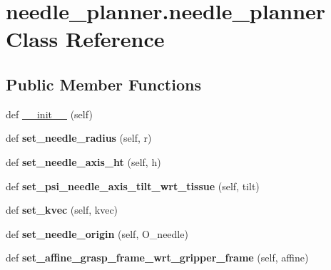 \hypertarget{classneedle__planner_1_1needle__planner}{}\section{needle\+\_\+planner.\+needle\+\_\+planner Class Reference}
\label{classneedle__planner_1_1needle__planner}
\subsection*{Public Member Functions}
\begin{DoxyCompactItemize}
\item 
def \hyperlink{classneedle__planner_1_1needle__planner_ad4b6932ae2ef9acccb0075ab793d9866}{\+\_\+\+\_\+init\+\_\+\+\_\+} (self)
\item 
def {\bfseries set\+\_\+needle\+\_\+radius} (self, r)\hypertarget{classneedle__planner_1_1needle__planner_a8e65096c2da1208e3cb48adcae4b94a6}{}\label{classneedle__planner_1_1needle__planner_a8e65096c2da1208e3cb48adcae4b94a6}

\item 
def {\bfseries set\+\_\+needle\+\_\+axis\+\_\+ht} (self, h)\hypertarget{classneedle__planner_1_1needle__planner_a21d8d9d5f690cc1b1f7533ac7363ed96}{}\label{classneedle__planner_1_1needle__planner_a21d8d9d5f690cc1b1f7533ac7363ed96}

\item 
def {\bfseries set\+\_\+psi\+\_\+needle\+\_\+axis\+\_\+tilt\+\_\+wrt\+\_\+tissue} (self, tilt)\hypertarget{classneedle__planner_1_1needle__planner_a088675bcce99a8e830852fb9286d0548}{}\label{classneedle__planner_1_1needle__planner_a088675bcce99a8e830852fb9286d0548}

\item 
def {\bfseries set\+\_\+kvec} (self, kvec)\hypertarget{classneedle__planner_1_1needle__planner_af6a33d47b126863fda7401a737e6a854}{}\label{classneedle__planner_1_1needle__planner_af6a33d47b126863fda7401a737e6a854}

\item 
def {\bfseries set\+\_\+needle\+\_\+origin} (self, O\+\_\+needle)\hypertarget{classneedle__planner_1_1needle__planner_a095d938c20e0ef0754d32db850f418db}{}\label{classneedle__planner_1_1needle__planner_a095d938c20e0ef0754d32db850f418db}

\item 
def {\bfseries set\+\_\+affine\+\_\+grasp\+\_\+frame\+\_\+wrt\+\_\+gripper\+\_\+frame} (self, affine)\hypertarget{classneedle__planner_1_1needle__planner_a5a14d3b50d32daf328cbf6e08f41331e}{}\label{classneedle__planner_1_1needle__planner_a5a14d3b50d32daf328cbf6e08f41331e}


\end{DoxyCompactItemize}
